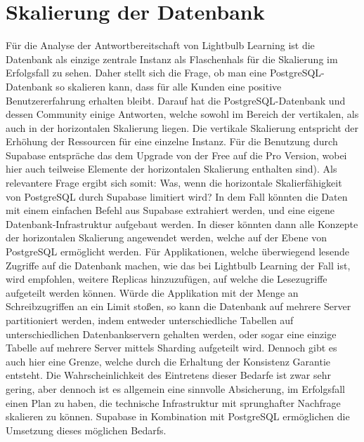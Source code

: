 \section{Skalierung der Datenbank}
Für die Analyse der Antwortbereitschaft von Lightbulb Learning ist die Datenbank als einzige zentrale Instanz als Flaschenhals für die Skalierung im Erfolgsfall zu sehen. Daher stellt sich die Frage, ob man eine PostgreSQL-Datenbank so skalieren kann, dass für alle Kunden eine positive Benutzererfahrung erhalten bleibt. Darauf hat die PostgreSQL-Datenbank und dessen Community einige Antworten, welche sowohl im Bereich der vertikalen, als auch in der horizontalen Skalierung liegen. Die vertikale Skalierung entspricht der Erhöhung der Ressourcen für eine einzelne Instanz. Für die Benutzung durch Supabase entspräche das dem Upgrade von der Free auf die Pro Version, wobei hier auch teilweise Elemente der horizontalen Skalierung enthalten sind). Als relevantere Frage ergibt sich somit: Was, wenn die horizontale Skalierfähigkeit von PostgreSQL durch Supabase limitiert wird? In dem Fall könnten die Daten mit einem einfachen Befehl aus Supabase extrahiert werden, und eine eigene Datenbank-Infrastruktur aufgebaut werden. In dieser könnten dann alle Konzepte der horizontalen Skalierung angewendet werden, welche auf der Ebene von PostgreSQL ermöglicht werden. Für Applikationen, welche überwiegend lesende Zugriffe auf die Datenbank machen, wie das bei Lightbulb Learning der Fall ist, wird empfohlen, weitere Replicas hinzuzufügen, auf welche die Lesezugriffe aufgeteilt werden können. Würde die Applikation mit der Menge an Schreibzugriffen an ein Limit stoßen, so kann die Datenbank auf mehrere Server partitioniert werden, indem entweder unterschiedliche Tabellen auf unterschiedlichen Datenbankservern gehalten werden, oder sogar eine einzige Tabelle auf mehrere Server mittels Sharding aufgeteilt wird. Dennoch gibt es auch hier eine Grenze, welche durch die Erhaltung der Konsistenz Garantie entsteht. Die Wahrscheinlichkeit des Eintretens dieser Bedarfe ist zwar sehr gering, aber dennoch ist es allgemein eine sinnvolle Absicherung, im Erfolgsfall einen Plan zu haben, die technische Infrastruktur mit sprunghafter Nachfrage skalieren zu können. Supabase in Kombination mit PostgreSQL ermöglichen die Umsetzung dieses möglichen Bedarfs.
